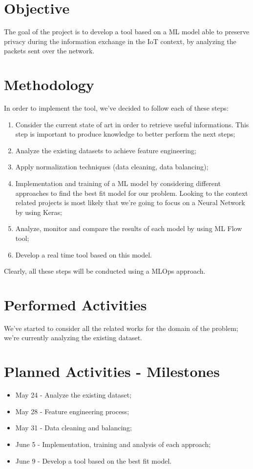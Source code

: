 \documentclass[sigconf]{acmart}
\begin{document}
\section{Objective}
The goal of the project is to develop a tool based on a ML model able to preserve privacy during the information exchange in the IoT context, by analyzing the packets sent over the network.

\section{Methodology}
In order to implement the tool, we've decided to follow each of these steps:
\begin{enumerate}
\item Consider the current state of art in order to retrieve useful informations. This step is important to produce knowledge to better perform the next steps;
\item Analyze the existing datasets to achieve feature engineering;
\item Apply normalization techniques (data cleaning, data balancing);
\item Implementation and training of a ML model by considering different approaches to find the best fit model for our problem. Looking to the context related projects is most likely that we're going to focus on a Neural Network by using Keras;
\item Analyze, monitor and compare the results of each model by using ML Flow tool;
\item Develop a real time tool based on this model.
\end{enumerate}
Clearly, all these steps will be conducted using a MLOps approach.

\section{Performed Activities}
We've started to consider all the related works for the domain of the problem; we're currently analyzing the existing dataset.
\section{Planned Activities - Milestones}
\begin{itemize}
\item May 24 - Analyze the existing dataset;
\item May 28 - Feature engineering process;
\item May 31 - Data cleaning and balancing;
\item June 5 - Implementation, training and analysis of each approach;
\item June 9 - Develop a tool based on the best fit model.
\end{itemize}

    
    
\end{document}
